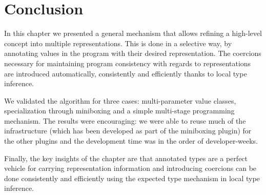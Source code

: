 \section{Conclusion}

In this chapter we presented a general mechanism that allows refining a high-level concept into multiple representations. This is done in a selective way, by annotating  values in the program with their desired representation. The coercions necessary for maintaining program consistency with regards to representations are introduced automatically, consistently and efficiently thanks to local type inference.

We validated the algorithm for three cases: multi-pa\-ram\-e\-ter value classes, specialization through miniboxing and a simple multi-stage programming mechanism. The results were encouraging: we were able to reuse much of the infrastructure (which has been developed as part of the miniboxing plugin) for the other plugins and the development time was in the order of developer-weeks.

Finally, the key insights of the chapter are that annotated types are a perfect vehicle for carrying representation information and introducing coercions can be done consistently and efficiently using the expected type mechanism in local type inference.

